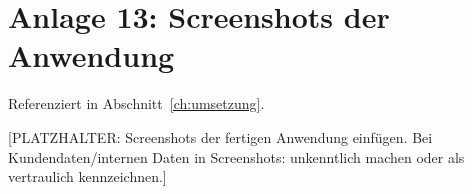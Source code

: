 \section*{Anlage 13: Screenshots der Anwendung}
\label{anh:screenshots}
Referenziert in Abschnitt~\ref{ch:umsetzung}.

[PLATZHALTER: Screenshots der fertigen Anwendung einf\"ugen. Bei
Kundendaten/internen Daten in Screenshots: unkenntlich machen oder als
vertraulich kennzeichnen.]
